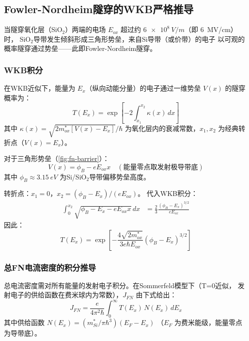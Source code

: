\documentclass[11pt,a4paper,twoside]{article}
\theoremstyle{definition}
\theoremstyle{plain}
\theoremstyle{remark}
\begin{document}
\subsection{Fowler-Nordheim隧穿的WKB严格推导}
\label{sec:fn-wkb}

当隧穿氧化层（SiO$_2$）两端的电场 $E_{ox}$ 超过约
$\SI{6e8}{V/m}$（即 \SI{6}{MV/cm}）时，
SiO$_2$导带发生倾斜形成三角形势垒，来自Si导带（或价带）的电子
以可观的概率隧穿通过势垒——此即Fowler-Nordheim隧穿。

\subsubsection{WKB积分}

在WKB近似下，能量为 $E_x$（纵向动能分量）的电子通过一维势垒
$V(x)$ 的隧穿概率为：
\begin{equation}\label{eq:wkb}
  T(E_x) = \exp\!\left[ -2 \int_{x_1}^{x_2} \kappa(x)\, dx \right]
\end{equation}
其中 $\kappa(x) = \sqrt{2 m^*_{ox} [V(x) - E_x]} / \hbar$
为氧化层内的衰减常数，$x_1, x_2$ 为经典转折点（$V(x) = E_x$）。

对于三角形势垒（\cref{fig:fn-barrier}）：
\begin{equation}
  V(x) = \phi_B - e E_{ox} x \quad (\text{能量零点取发射极导带底})
\end{equation}
其中 $\phi_B \approx \SI{3.15}{eV}$ 为Si/SiO$_2$导带偏移势垒高度。

转折点：$x_1 = 0$，$x_2 = (\phi_B - E_x)/(e E_{ox})$。
代入WKB积分：
\begin{align}
  \int_0^{x_2} \sqrt{\phi_B - E_x - e E_{ox} x}\, dx
  &= \frac{2}{3} \frac{(\phi_B - E_x)^{3/2}}{e E_{ox}}
\end{align}
因此：
\begin{equation}\label{eq:wkb-t}
  T(E_x) = \exp\!\left[ -\frac{4\sqrt{2 m^*_{ox}}}{3 e \hbar E_{ox}}
            (\phi_B - E_x)^{3/2} \right]
\end{equation}

\subsubsection{总FN电流密度的积分推导}

总电流密度需对所有能量的发射电子积分。在Sommerfeld模型下（T=0近似，
发射电子的供给函数在费米球内为常数），$J_{FN}$ 由下式给出：
\begin{equation}\label{eq:fn-integral}
  J_{FN} = \frac{e}{4\pi^2 \hbar} \int_{0}^{\infty}
           T(E_x) \, N(E_x) \, dE_x
\end{equation}
其中供给函数 $N(E_x) = (m^*_{Si} / \pi \hbar^3) (E_F - E_x)$
（$E_F$ 为费米能级，能量零点为导带底）。
\end{document}
